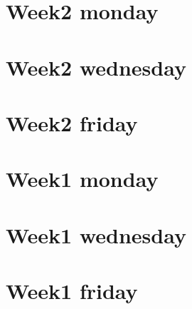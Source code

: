 
\section*{Week2 monday}

\vfill
\section*{Week2 wednesday}

\vfill
\section*{Week2 friday}

\vfill
\section*{Week1 monday}

\vfill
\section*{Week1 wednesday}

\vfill
\section*{Week1 friday}

\vfill
